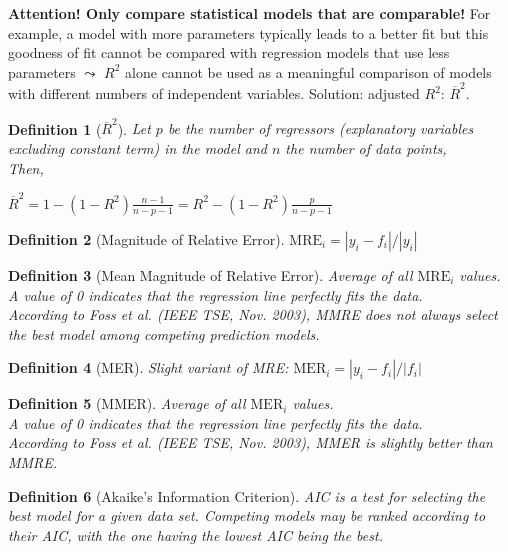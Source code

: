 \documentclass[a4paper,11pt]{report}
\newtheorem{definition}{Definition}
\begin{document}
\textbf{Attention! Only compare statistical models that are comparable!} For
example, a model with more parameters typically leads to a better fit but this
goodness of fit cannot be compared with regression models that use less
parameters $\leadsto$ $R^2$ alone cannot be used as a meaningful comparison of
models with different numbers of independent variables. Solution: adjusted
$R^2$: $\overline{R}^2$.

\begin{definition}[$\overline{R}^2$]
Let $p$ be the number of regressors (explanatory variables excluding constant
term) in the model and $n$ the number of data points,\\

Then,
\begin{center}
$\overline{R}^2 = 1 - (1 - R^2)\frac{n-1}{n-p-1} = R^2 - (1 - R^2)
\frac{p}{n-p-1}$
\end{center}
\end{definition}

\begin{definition}[Magnitude of Relative Error]
$\text{MRE}_i = |y_i-f_i| / |y_i|$
\end{definition}

\begin{definition}[Mean Magnitude of Relative Error]
Average of all $\text{MRE}_i$ values.\\

A value of 0 indicates that the regression line perfectly fits the data.\\
According to Foss et al. (IEEE TSE, Nov. 2003), MMRE does not always select the
best model among competing prediction models.
\end{definition}

\begin{definition}[MER]
Slight variant of MRE: $\text{MER}_i = |y_i-f_i| / |f_i|$
\end{definition}

\begin{definition}[MMER]
Average of all $\text{MER}_i$ values.\\

A value of 0 indicates that the regression line perfectly fits the data.\\
According to Foss et al. (IEEE TSE, Nov. 2003), MMER is slightly better than
MMRE.
\end{definition}

\begin{definition}[Akaike’s Information Criterion]
AIC is a test for selecting the best model for a given data set. Competing
models may be ranked according to their AIC, with the one having the lowest AIC
being the best.\\
\end{definition}
\end{document}
